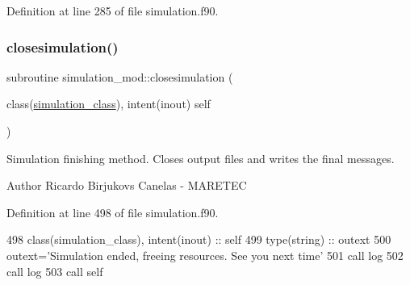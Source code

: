 Definition at line 285 of file simulation.\+f90.


\mbox{\label{namespacesimulation__mod_a4285722eaa589fa671233554b54c74f8}} 
\subsubsection{\texorpdfstring{closesimulation()}{closesimulation()}}
{\footnotesize\ttfamily subroutine simulation\+\_\+mod\+::closesimulation (\begin{DoxyParamCaption}\item[{class(\mbox{\hyperlink{structsimulation__mod_1_1simulation__class}{simulation\+\_\+class}}), intent(inout)}]{self }\end{DoxyParamCaption})\hspace{0.3cm}{\ttfamily [private]}}



Simulation finishing method. Closes output files and writes the final messages. 

\begin{DoxyAuthor}{Author}
Ricardo Birjukovs Canelas -\/ M\+A\+R\+E\+T\+EC 
\end{DoxyAuthor}


Definition at line 498 of file simulation.\+f90.


\begin{DoxyCode}
498     \textcolor{keywordtype}{class}(simulation\_class), \textcolor{keywordtype}{intent(inout)} :: self
499     \textcolor{keywordtype}{type}(string) :: outext
500     outext=\textcolor{stringliteral}{'Simulation ended, freeing resources. See you next time'}
501     \textcolor{keyword}{call }log%
502     \textcolor{keyword}{call }log%
503     \textcolor{keyword}{call }self%
\end{DoxyCode}
\mbox{\label{namespacesimulation__mod_a2b8198a9fb3f7671c6b45192a0b9740c}} 

